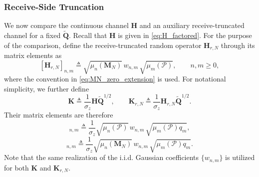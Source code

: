 \documentclass[lettersize,journal]{IEEEtran}
\theoremstyle{plain}
\begin{document}
\subsubsection{Receive-Side Truncation}

We now compare the continuous channel $\mathbf H$ and an
auxiliary receive-truncated channel for a fixed
$\widetilde{\mathbf Q}$. Recall that $\mathbf H$ is given in
\eqref{eq:H_factored}. For the purpose of the comparison, define
the receive-truncated random operator $\mathbf H_{r,N}$ through
its matrix elements as
$$
	[\mathbf H_{r,N}]_{n,m}
	\triangleq
	\sqrt{\mu_n(\mathbf M_N)}
	\,w_{n,m}\,
	\sqrt{\mu_m(\mathcal P)},
	\qquad n,m\geq0,
	\label{eq:receive_truncated_channel}
$$
where the convention in \eqref{eq:MN_zero_extension} is used.
For notational simplicity, we further define
$$
	\mathbf K
	\triangleq
	\frac{1}{\sigma_z}
	\mathbf H\widetilde{\mathbf Q}^{1/2},
	\qquad
	\mathbf K_{r,N}
	\triangleq
	\frac{1}{\sigma_z}
	\mathbf H_{r,N}\widetilde{\mathbf Q}^{1/2}.
	\label{eq:weighted_receive_channels}
$$
Their matrix elements are therefore
\begin{equation}
	[\mathbf K]_{n,m}
	\triangleq
	\frac{1}{\sigma_z}
	\sqrt{\mu_n(\mathcal P)}
	\,w_{n,m}\,
	\sqrt{\mu_m(\mathcal P)q_m},
	\label{eq:K_element}
\end{equation}
\begin{equation}
	[\mathbf K_{r,N}]_{n,m}
	\triangleq
	\frac{1}{\sigma_z}
	\sqrt{\mu_n(\mathbf M_N)}
	\,w_{n,m}\,
	\sqrt{\mu_m(\mathcal P)q_m}.
	\label{eq:KrN_element}
\end{equation}
Note that the same realization of the i.i.d. Gaussian
coefficients $\{w_{n,m}\}$ is utilized for both
$\mathbf K$ and $\mathbf K_{r,N}$.
\end{document}
